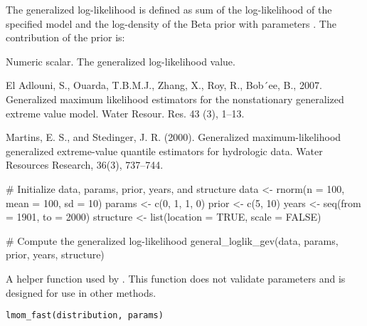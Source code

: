 \documentclass[a4paper]{book}
\begin{document}
%
\begin{Details}
The generalized log-likelihood is defined as sum of the log-likelihood of the
specified model and the log-density of the Beta prior with parameters .
The contribution of the prior is: 
\end{Details}
%
\begin{Value}
Numeric scalar. The generalized log-likelihood value.
\end{Value}
%
\begin{References}
El Adlouni, S., Ouarda, T.B.M.J., Zhang, X., Roy, R., Bob´ee, B., 2007. Generalized
maximum likelihood estimators for the nonstationary generalized extreme value
model. Water Resour. Res. 43 (3), 1–13. 

Martins, E. S., and Stedinger, J. R. (2000). Generalized maximum-likelihood generalized
extreme-value quantile estimators for hydrologic data. Water Resources Research, 36(3),
737–744. 
\end{References}
%
\begin{SeeAlso}
\end{SeeAlso}
%
\begin{Examples}
\begin{ExampleCode}
# Initialize data, params, prior, years, and structure
data <- rnorm(n = 100, mean = 100, sd = 10)
params <- c(0, 1, 1, 0)
prior <- c(5, 10)
years <- seq(from = 1901, to = 2000)
structure <- list(location = TRUE, scale = FALSE)

# Compute the generalized log-likelihood
general_loglik_gev(data, params, prior, years, structure)

\end{ExampleCode}
\end{Examples}
%
\begin{Description}
A helper function used by .
This function does not validate parameters and is designed for use in other methods.
\end{Description}
%
\begin{Usage}
\begin{verbatim}
lmom_fast(distribution, params)
\end{verbatim}
\end{Usage}
\end{document}

